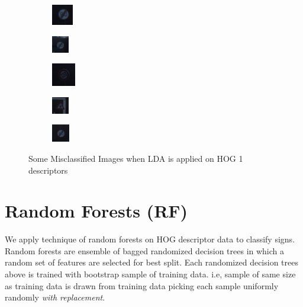 \documentclass[a4paper]{article}
\begin{document}
\begin{figure}
\begin{subfigure}{.5\textwidth}
  \centering
  \includegraphics[scale = 2]{1.png}
  \caption{}
  \label{fig:sfig1}
\end{subfigure}%
\begin{subfigure}{.5\textwidth}
  \centering
  \includegraphics[scale = 2]{2.png}
  \caption{}
  \label{fig:sfig2}
\end{subfigure}
\begin{subfigure}{.5\textwidth}
  \centering
  \includegraphics[scale = 2]{3.png}
  \caption{}
  \label{fig:sfig2}
\end{subfigure}
\begin{subfigure}{.5\textwidth}
  \centering
  \includegraphics[scale = 2]{4.png}
  \caption{}
  \label{fig:sfig2}
\end{subfigure}
\begin{subfigure}{.5\textwidth}
  \centering
  \includegraphics[scale = 2]{5.png}
  \caption{}
  \label{fig:sfig2}
\end{subfigure}
\caption{Some Misclassified Images when LDA is applied on HOG 1 descriptors}
\end{figure}

\section{Random Forests (RF)\cite{textbook}}
We apply technique of random forests on HOG descriptor data to classify signs. Random forests are ensemble of bagged randomized decision trees in which a random set of features are selected for best split. Each randomized decision trees above is trained with bootstrap sample of training data. i.e, sample of same size as training data is drawn from training data picking each sample uniformly randomly \emph{with replacement}.
\end{document}
